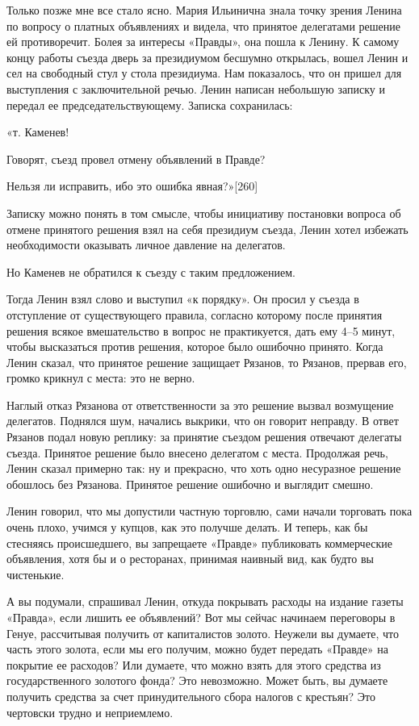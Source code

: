 \documentclass[12pt, a4paper, openany]{book}
\begin{document}
Только позже мне все стало ясно. Мария Ильинична знала точку зрения Ленина по вопросу о платных объявлениях и видела, что принятое делегатами решение ей противоречит. Болея за интересы «Правды», она пошла к Ленину. К самому концу работы съезда дверь за президиумом бесшумно открылась, вошел Ленин и сел на свободный стул у стола президиума. Нам показалось, что он пришел для выступления с заключительной речью. Ленин написан небольшую записку и передал ее председательствующему. Записка сохранилась:

«т. Каменев!

Говорят, съезд провел отмену объявлений в Правде?

Нельзя ли исправить, ибо это ошибка явная?»[260]

Записку можно понять в том смысле, чтобы инициативу постановки вопроса об отмене принятого решения взял на себя президиум съезда, Ленин хотел избежать необходимости оказывать личное давление на делегатов.

Но Каменев не обратился к съезду с таким предложением.

Тогда Ленин взял слово и выступил «к порядку». Он просил у съезда в отступление от существующего правила, согласно которому после принятия решения всякое вмешательство в вопрос не практикуется, дать ему 4–5 минут, чтобы высказаться против решения, которое было ошибочно принято. Когда Ленин сказал, что принятое решение защищает Рязанов, то Рязанов, прервав его, громко крикнул с места: это не верно.

Наглый отказ Рязанова от ответственности за это решение вызвал возмущение делегатов. Поднялся шум, начались выкрики, что он говорит неправду. В ответ Рязанов подал новую реплику: за принятие съездом решения отвечают делегаты съезда. Принятое решение было внесено делегатом с места. Продолжая речь, Ленин сказал примерно так: ну и прекрасно, что хоть одно несуразное решение обошлось без Рязанова. Принятое решение ошибочно и выглядит смешно.

Ленин говорил, что мы допустили частную торговлю, сами начали торговать пока очень плохо, учимся у купцов, как это получше делать. И теперь, как бы стесняясь происшедшего, вы запрещаете «Правде» публиковать коммерческие объявления, хотя бы и о ресторанах, принимая наивный вид, как будто вы чистенькие.

А вы подумали, спрашивал Ленин, откуда покрывать расходы на издание газеты «Правда», если лишить ее объявлений? Вот мы сейчас начинаем переговоры в Генуе, рассчитывая получить от капиталистов золото. Неужели вы думаете, что часть этого золота, если мы его получим, можно будет передать «Правде» на покрытие ее расходов? Или думаете, что можно взять для этого средства из государственного золотого фонда? Это невозможно. Может быть, вы думаете получить средства за счет принудительного сбора налогов с крестьян? Это чертовски трудно и неприемлемо.
\end{document}
